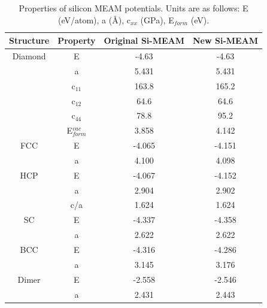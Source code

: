 \documentclass[review]{elsarticle}
\begin{document}
\begin{table}[h]
\caption{Properties of silicon MEAM potentials.  Units are as follows: E (eV/atom), a (\AA), c$_{xx}$ (GPa), E$_{form}$ (eV).     }\label{tab:ben2}
\begin{center}
\begin{tabular}{|c|c|c|c|}
     \hline
     Structure & Property & Original Si-MEAM  & New Si-MEAM \\
     \hline
     Diamond & E & -4.63 & -4.63 \\
     & a & 5.431 & 5.431  \\
     & c$_{11}$ & 163.8 & 165.2 \\
    & c$_{12}$  & 64.6 &	64.6 \\
 & c$_{44}$ & 78.8	& 95.2 \\
& E$_{form}^{vac}$ &3.858 & 4.142 \\
    \hline
FCC & E &-4.065 &	-4.151 \\
& a & 4.100 &	4.098 \\
    \hline
HCP &  E &-4.067 &	-4.152 \\
& a & 2.904 &	2.902 \\
& c/a & 1.624 &	1.624 \\ 
    \hline
SC & E & -4.337 &	-4.358 \\
& a &2.622 &	2.622 \\
    \hline
BCC & E & -4.316 &	-4.286 \\
& a & 3.145 &	3.176 \\
    \hline
Dimer & E & -2.558 &	-2.546 \\
& a & 2.431 &	2.443 \\
           \hline
\end{tabular}
\end{center}
\label{default}
\end{table}%
\end{document}
